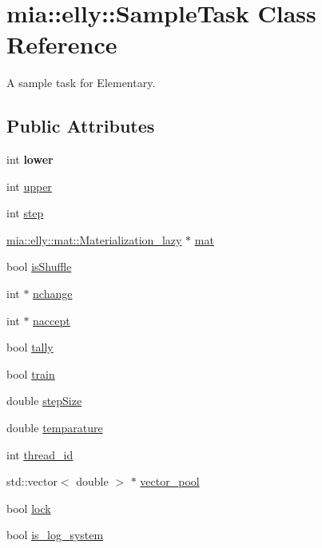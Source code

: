 \hypertarget{classmia_1_1elly_1_1_sample_task}{\section{mia\-:\-:elly\-:\-:Sample\-Task Class Reference}
\label{classmia_1_1elly_1_1_sample_task}
}


A sample task for Elementary.  


\subsection*{Public Attributes}
\begin{DoxyCompactItemize}
\item 
\hypertarget{classmia_1_1elly_1_1_sample_task_a670314f827295577a67d96fbde05cc98}{int {\bfseries lower}}\label{classmia_1_1elly_1_1_sample_task_a670314f827295577a67d96fbde05cc98}

\item 
int \hyperlink{classmia_1_1elly_1_1_sample_task_a2c68193169212401fd9dfc53669ac615}{upper}
\item 
int \hyperlink{classmia_1_1elly_1_1_sample_task_aac20c514247f8c744d7875f75285e620}{step}
\item 
\hyperlink{classmia_1_1elly_1_1mat_1_1_materialization__lazy}{mia\-::elly\-::mat\-::\-Materialization\-\_\-lazy} $\ast$ \hyperlink{classmia_1_1elly_1_1_sample_task_ad3f4357179b2e6be1edada71febed8de}{mat}
\item 
bool \hyperlink{classmia_1_1elly_1_1_sample_task_a6d722099cbec603924b6b70b5d68360e}{is\-Shuffle}
\item 
int $\ast$ \hyperlink{classmia_1_1elly_1_1_sample_task_a5991780307c024d2f458bf264db39e4a}{nchange}
\item 
int $\ast$ \hyperlink{classmia_1_1elly_1_1_sample_task_af640fef9f121e0d175ea710260b78746}{naccept}
\item 
bool \hyperlink{classmia_1_1elly_1_1_sample_task_a78c30f72cc6f55e71b22c617f4792e15}{tally}
\item 
bool \hyperlink{classmia_1_1elly_1_1_sample_task_a0afe772ae43756bdf8bb7989249ec0b1}{train}
\item 
double \hyperlink{classmia_1_1elly_1_1_sample_task_a030ab30b66c586f7dc0c3dac519c95a1}{step\-Size}
\item 
double \hyperlink{classmia_1_1elly_1_1_sample_task_a06561b09384d2d9f0b330fff1d4d7a3e}{temparature}
\item 
int \hyperlink{classmia_1_1elly_1_1_sample_task_ab891fbcdcb66fdd2283fabf936e11b81}{thread\-\_\-id}
\item 
std\-::vector$<$ double $>$ $\ast$ \hyperlink{classmia_1_1elly_1_1_sample_task_a36f2fe71571b038d8f9df5888576d8e8}{vector\-\_\-pool}
\item 
bool \hyperlink{classmia_1_1elly_1_1_sample_task_a73c4d5c112ff7fe2f998b3a332ad43eb}{lock}
\item 
bool \hyperlink{classmia_1_1elly_1_1_sample_task_a04bd3729c1156abd854d947158dfc899}{is\-\_\-log\-\_\-system}
\end{DoxyCompactItemize}


